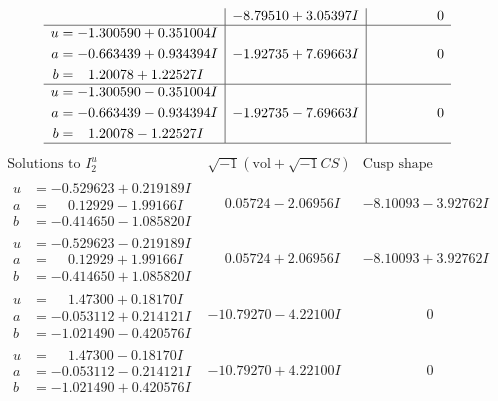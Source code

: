 \documentclass[1p]{elsarticle_modified}
\theoremstyle{definition}
\newcommand{\I}{\sqrt{-1}}
\begin{document}
$$\begin{array}{c|c|c}
 & -8.79510 + 3.05397 I & \phantom{-0.000000 } 0 \\ \hline\begin{aligned}
u &= -1.300590 + 0.351004 I \\
a &= -0.663439 + 0.934394 I \\
b &= \phantom{-}1.20078 + 1.22527 I\end{aligned}
 & -1.92735 + 7.69663 I & \phantom{-0.000000 } 0 \\ \hline\begin{aligned}
u &= -1.300590 - 0.351004 I \\
a &= -0.663439 - 0.934394 I \\
b &= \phantom{-}1.20078 - 1.22527 I\end{aligned}
 & -1.92735 - 7.69663 I & \phantom{-0.000000 } 0\\
 \hline 
 \end{array}$$\newpage$$\begin{array}{c|c|c}  
\text{Solutions to }I^u_{2}& \I (\text{vol} + \sqrt{-1}CS) & \text{Cusp shape}\\
 \hline 
\begin{aligned}
u &= -0.529623 + 0.219189 I \\
a &= \phantom{-}0.12929 - 1.99166 I \\
b &= -0.414650 - 1.085820 I\end{aligned}
 & \phantom{-}0.05724 - 2.06956 I & -8.10093 - 3.92762 I \\ \hline\begin{aligned}
u &= -0.529623 - 0.219189 I \\
a &= \phantom{-}0.12929 + 1.99166 I \\
b &= -0.414650 + 1.085820 I\end{aligned}
 & \phantom{-}0.05724 + 2.06956 I & -8.10093 + 3.92762 I \\ \hline\begin{aligned}
u &= \phantom{-}1.47300 + 0.18170 I \\
a &= -0.053112 + 0.214121 I \\
b &= -1.021490 - 0.420576 I\end{aligned}
 & -10.79270 - 4.22100 I & \phantom{-0.000000 } 0 \\ \hline\begin{aligned}
u &= \phantom{-}1.47300 - 0.18170 I \\
a &= -0.053112 - 0.214121 I \\
b &= -1.021490 + 0.420576 I\end{aligned}
 & -10.79270 + 4.22100 I & \phantom{-0.000000 } 0 \\ \hline\begin{aligned}

\end{aligned}
\end{array}$$
\end{document}
